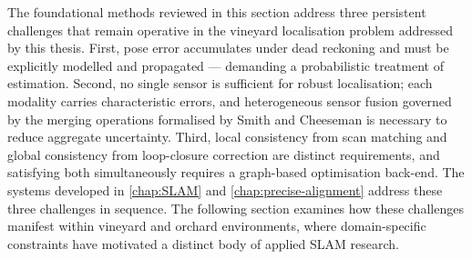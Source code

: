 The foundational methods reviewed in this section address three persistent challenges that remain operative in the vineyard localisation problem addressed by this thesis. First, pose error accumulates under dead reckoning and must be explicitly modelled and propagated --- demanding a probabilistic treatment of estimation. Second, no single sensor is sufficient for robust localisation; each modality carries characteristic errors, and heterogeneous sensor fusion governed by the merging operations formalised by Smith and Cheeseman is necessary to reduce aggregate uncertainty. Third, local consistency from scan matching and global consistency from loop-closure correction are distinct requirements, and satisfying both simultaneously requires a graph-based optimisation back-end. The systems developed in \cref{chap:SLAM} and \cref{chap:precise-alignment} address these three challenges in sequence. The following section examines how these challenges manifest within vineyard and orchard environments, where domain-specific constraints have motivated a distinct body of applied SLAM research.

